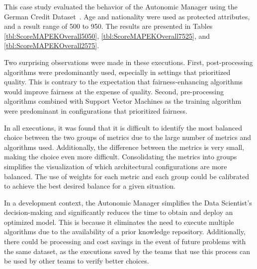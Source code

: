 \documentclass[sigconf]{acmart}
\begin{document}
This case study evaluated the behavior of the Autonomic Manager using the German Credit Dataset~\citep{ucigerman_2021}. Age and nationality were used as protected attributes, and a result range of 500 to 950. The results are presented in Tables \ref{tbl:ScoreMAPEKOverall5050}, \ref{tbl:ScoreMAPEKOverall7525}, and \ref{tbl:ScoreMAPEKOverall2575}.

Two surprising observations were made in these executions. First, post-processing algorithms were predominantly used, especially in settings that prioritized quality. This is contrary to the expectation that fairness-enhancing algorithms would improve fairness at the expense of quality. Second, pre-processing algorithms combined with Support Vector Machines as the training algorithm were predominant in configurations that prioritized fairness.

In all executions, it was found that it is difficult to identify the most balanced choice between the two groups of metrics due to the large number of metrics and algorithms used. Additionally, the difference between the metrics is very small, making the choice even more difficult. Consolidating the metrics into groups simplifies the visualization of which architectural configurations are more balanced. The use of weights for each metric and each group could be calibrated to achieve the best desired balance for a given situation. 

In a development context, the Autonomic Manager simplifies the Data Scientist's decision-making and significantly reduces the time to obtain and deploy an optimized model. This is because it eliminates the need to execute multiple algorithms due to the availability of a prior knowledge repository. Additionally, there could be processing and cost savings in the event of future problems with the same dataset, as the executions saved by the teams that use this process can be used by other teams to verify better choices.
\end{document}
